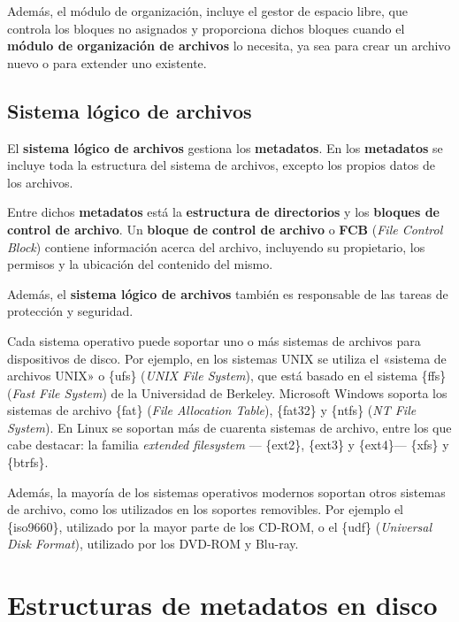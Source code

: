 Además, el módulo de organización, incluye el gestor de espacio libre,
que controla los bloques no asignados y proporciona dichos bloques
cuando el \textbf{módulo de organización de archivos} lo necesita, ya
sea para crear un archivo nuevo o para extender uno existente.

\subsection{Sistema lógico de
archivos}\label{_sistema_luxf3gico_de_archivos}

El \textbf{sistema lógico de archivos} gestiona los \textbf{metadatos}.
En los \textbf{{}metadatos} se incluye toda la estructura del sistema de
archivos, excepto los propios datos de los archivos.

Entre dichos \textbf{metadatos} está la \textbf{estructura de
directorios} y los \textbf{bloques de control de archivo}. Un
\textbf{bloque de control de archivo}{} o \textbf{{}FCB} (\emph{File
Control Block}) contiene información acerca del archivo, incluyendo su
propietario, los permisos y la ubicación del contenido del mismo.

Además, el \textbf{sistema lógico de archivos} también es responsable de
las tareas de protección y seguridad.

Cada sistema operativo puede soportar uno o más sistemas de archivos
para dispositivos de disco. Por ejemplo, en los sistemas UNIX se utiliza
el «sistema de archivos UNIX» o \{ufs\} (\emph{UNIX File System}), que
está basado en el sistema \{ffs\} (\emph{Fast File System}) de la
Universidad de Berkeley. Microsoft Windows soporta los sistemas de
archivo \{fat\} (\emph{File Allocation Table}), \{fat32\} y \{ntfs\}
(\emph{NT File System}). En Linux se soportan más de cuarenta sistemas
de archivo, entre los que cabe destacar: la familia \emph{extended
filesystem} --- \{ext2\}, \{ext3\} y \{ext4\}--- \{xfs\} y \{btrfs\}.

Además, la mayoría de los sistemas operativos modernos soportan otros
sistemas de archivo, como los utilizados en los soportes removibles. Por
ejemplo el \{iso9660\}, utilizado por la mayor parte de los CD-ROM, o el
\{udf\} (\emph{Universal Disk Format}), utilizado por los DVD-ROM y
Blu-ray.

\section{Estructuras de metadatos en
disco}\label{_estructuras_de_metadatos_en_disco}

